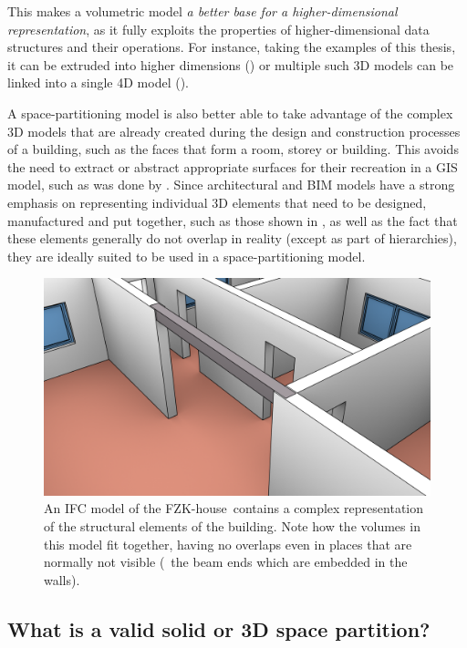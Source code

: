 This makes a volumetric model \emph{a better base for a higher-dimensional representation}, as it fully exploits the properties of higher-dimensional data structures and their operations.
For instance, taking the examples of this thesis, it can be extruded into higher dimensions () or multiple such 3D models can be linked into a single 4D model ().

A space-partitioning model is also better able to take advantage of the complex 3D models that are already created during the design and construction processes of a building, such as the faces that form a room, storey or building.
This avoids the need to extract or abstract appropriate surfaces for their recreation in a GIS model, such as was done by \citet{Donkers13}.
Since architectural and BIM models have a strong emphasis on representing individual 3D elements that need to be designed, manufactured and put together, such as those shown in , as well as the fact that these elements generally do not overlap in reality (except as part of hierarchies), they are ideally suited to be used in a space-partitioning model.
\begin{figure}[tbp]
  \centering
  \includegraphics[width=\linewidth]{figs/ifc}
  \caption[An IFC model of the FZK-house]{An IFC model of the FZK-house\footnotemark\ contains a complex representation of the structural elements of the building. Note how the volumes in this model fit together, having no overlaps even in places that are normally not visible (\eg\ the beam ends which are embedded in the walls).}
\label{fig:fzk}
\end{figure}

\subsection{What is a valid solid or 3D space partition?}

